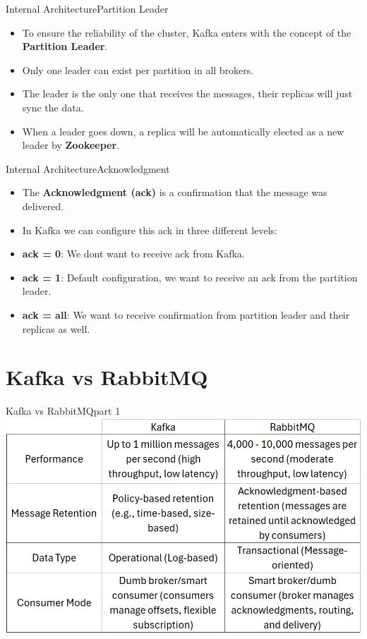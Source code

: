 \documentclass{beamer}
\begin{document}
\begin{frame}{Internal Architecture}{Partition Leader}
  \begin{itemize}
    \item To ensure the reliability of the cluster, Kafka enters with the concept of the \textbf{Partition Leader}.
    \item Only one leader can exist per partition in all brokers.
    \item The leader is the only one that receives the messages, their replicas will just sync the data.
    \item When a leader goes down, a replica will be automatically elected as a new leader by \textbf{Zookeeper}.
  \end{itemize}
\end{frame}

\begin{frame}{Internal Architecture}{Acknowledgment}
  \begin{itemize}
    \item The \textbf{Acknowledgment (ack)} is a confirmation that the message was delivered.
    \item In Kafka we can configure this ack in three different levels:
          \vspace*{1.2em}
    \item \textbf{ack = 0}: We dont want to receive ack from Kafka.
    \item \textbf{ack = 1}: Default configuration, we want to receive an ack from the partition leader.
    \item \textbf{ack = all}: We want to receive confirmation from partition leader and their replicas as well.
  \end{itemize}
\end{frame}


\section[Kafka vs RabbitMQ]{Kafka vs RabbitMQ}

\begin{frame}{Kafka vs RabbitMQ}{part 1}
  \includegraphics[width=1.02\textwidth]{fig/vs1.png}
\end{frame}
\end{document}
